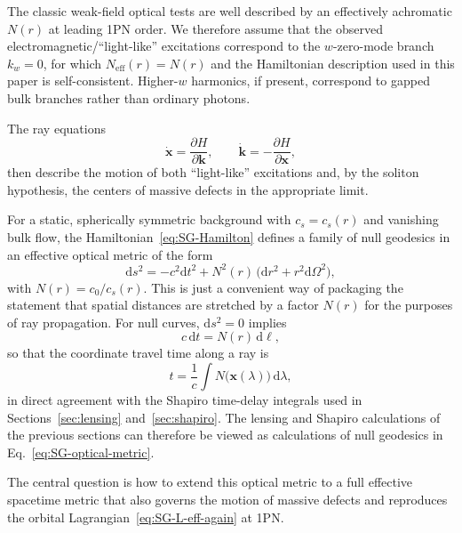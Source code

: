 \documentclass[11pt]{article}
\begin{document}
The classic weak-field optical tests are well described by an effectively
achromatic $N(r)$ at leading 1PN order.
We therefore assume that the observed electromagnetic/``light-like''
excitations correspond to the $w$-zero-mode branch $k_w=0$, for which
$N_{\mathrm{eff}}(r)=N(r)$ and the Hamiltonian description used in this paper
is self-consistent.
Higher-$w$ harmonics, if present, correspond to gapped bulk branches rather
than ordinary photons.

The ray equations
\begin{equation}
  \dot{\mathbf{x}} = \frac{\partial H}{\partial \mathbf{k}},
  \qquad
  \dot{\mathbf{k}} = -\frac{\partial H}{\partial \mathbf{x}},
  \label{eq:SG-Hamilton}
\end{equation}
then describe the motion of both ``light-like'' excitations and, by the
soliton hypothesis, the centers of massive defects in the appropriate
limit.

For a static, spherically symmetric background with $c_s = c_s(r)$ and
vanishing bulk flow, the Hamiltonian~\eqref{eq:SG-Hamilton} defines a
family of null geodesics in an effective optical metric of the form
\begin{equation}
  \mathrm{d}s^2
  = -c^2 \mathrm{d}t^2
    + N^2(r)\,\bigl(\mathrm{d}r^2 + r^2 \mathrm{d}\Omega^2\bigr),
  \label{eq:SG-optical-metric}
\end{equation}
with $N(r) = c_0 / c_s(r)$.
This is just a convenient way of packaging the statement that spatial
distances are stretched by a factor $N(r)$ for the purposes of ray
propagation.
For null curves, $\mathrm{d}s^2 = 0$ implies
\begin{equation*}
  c\,\mathrm{d}t = N(r)\,\mathrm{d}\ell,
\end{equation*}
so that the coordinate travel time along a ray is
\begin{equation*}
  t = \frac{1}{c}\int N\bigl(\mathbf{x}(\lambda)\bigr)\,\mathrm{d}\lambda,
\end{equation*}
in direct agreement with the Shapiro time-delay integrals used in
Sections~\ref{sec:lensing} and~\ref{sec:shapiro}.
The lensing and Shapiro calculations of the previous sections can therefore
be viewed as calculations of null geodesics in
Eq.~\eqref{eq:SG-optical-metric}.

The central question is how to extend this optical metric to a full
effective spacetime metric that also governs the motion of massive
defects and reproduces the orbital Lagrangian~\eqref{eq:SG-L-eff-again} at
1PN.
\end{document}
